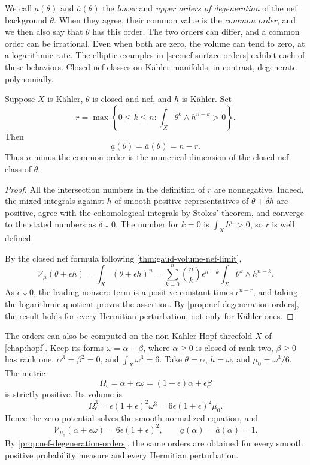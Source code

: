 We call $\underline a(\theta)$ and $\overline a(\theta)$ the \emph{lower} and \emph{upper orders of degeneration} of the nef background $\theta$. When they agree, their common value is the \emph{common order}, and we then also say that $\theta$ has this order. The two orders can differ, and a common order can be irrational. Even when both are zero, the volume can tend to zero, at a logarithmic rate. The elliptic examples in \cref{sec:nef-surface-orders} exhibit each of these behaviors. Closed nef classes on K\"ahler manifolds, in contrast, degenerate polynomially.

\begin{proposition}\label{prop:nef-degeneration-kahler}
Suppose $X$ is K\"ahler, $\theta$ is closed and nef, and $h$ is K\"ahler. Set
\[
 r=\max\left\{0\leq k\leq n:
          \int_X\theta^k\wedge h^{n-k}>0\right\}.
\]
Then
\[
 \underline a(\theta)=\overline a(\theta)=n-r.
\]
Thus $n$ minus the common order is the numerical dimension of the closed nef class of $\theta$.
\end{proposition}
\begin{proof}
All the intersection numbers in the definition of $r$ are nonnegative. Indeed, the mixed integrals against $h$ of smooth positive representatives of $\theta+\delta h$ are positive, agree with the cohomological integrals by Stokes' theorem, and converge to the stated numbers as $\delta\downarrow0$. The number for $k=0$ is $\int_Xh^n>0$, so $r$ is well defined.

By the closed nef formula following \cref{thm:gaud-volume-nef-limit},
\[
 \mathcal V_\mu(\theta+\epsilon h)
       =\int_X(\theta+\epsilon h)^n
       =\sum_{k=0}^n\binom nk\epsilon^{n-k}
                         \int_X\theta^k\wedge h^{n-k}.
\]
As $\epsilon\downarrow0$, the leading nonzero term is a positive constant times $\epsilon^{n-r}$, and taking the logarithmic quotient proves the assertion. By \cref{prop:nef-degeneration-orders}, the result holds for every Hermitian perturbation, not only for K\"ahler ones.
\end{proof}

The orders can also be computed on the non-K\"ahler Hopf threefold $X$ of \cref{chap:hopf}. Keep its forms $\omega=\alpha+\beta$, where $\alpha\geq0$ is closed of rank two, $\beta\geq0$ has rank one, $\alpha^3=\beta^2=0$, and $\int_X\omega^3=6$. Take $\theta=\alpha$, $h=\omega$, and $\mu_0=\omega^3/6$. The metric
\[
 \Omega_\epsilon=\alpha+\epsilon\omega
                    =(1+\epsilon)\alpha+\epsilon\beta
\]
is strictly positive. Its volume is
\[
 \Omega_\epsilon^3=\epsilon(1+\epsilon)^2\omega^3
                  =6\epsilon(1+\epsilon)^2\mu_0.
\]
Hence the zero potential solves the smooth normalized equation, and
\[
 \mathcal V_{\mu_0}(\alpha+\epsilon\omega)
             =6\epsilon(1+\epsilon)^2,
 \qquad
 \underline a(\alpha)=\overline a(\alpha)=1.
\]
By \cref{prop:nef-degeneration-orders}, the same orders are obtained for every smooth positive probability measure and every Hermitian perturbation.

